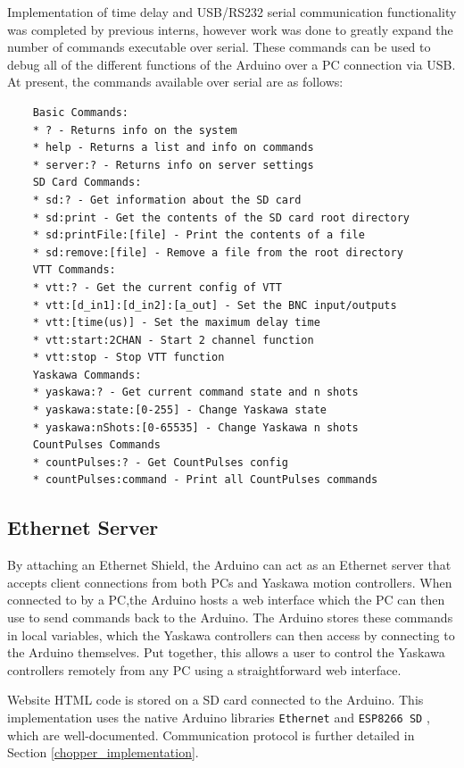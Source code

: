\documentclass{article}
\begin{document}
        Implementation of time delay and USB/RS232 serial communication functionality was completed by previous interns, however work was done to greatly expand the number of commands executable over serial. These commands can be used to debug all of the different functions of the Arduino over a PC connection via USB. At present, the commands available over serial are as follows:
        
        \begin{verbatim}
    Basic Commands:
    * ? - Returns info on the system
    * help - Returns a list and info on commands
    * server:? - Returns info on server settings
    SD Card Commands:
    * sd:? - Get information about the SD card
    * sd:print - Get the contents of the SD card root directory
    * sd:printFile:[file] - Print the contents of a file
    * sd:remove:[file] - Remove a file from the root directory
    VTT Commands:
    * vtt:? - Get the current config of VTT
    * vtt:[d_in1]:[d_in2]:[a_out] - Set the BNC input/outputs
    * vtt:[time(us)] - Set the maximum delay time
    * vtt:start:2CHAN - Start 2 channel function
    * vtt:stop - Stop VTT function
    Yaskawa Commands:
    * yaskawa:? - Get current command state and n shots
    * yaskawa:state:[0-255] - Change Yaskawa state
    * yaskawa:nShots:[0-65535] - Change Yaskawa n shots
    CountPulses Commands
    * countPulses:? - Get CountPulses config
    * countPulses:command - Print all CountPulses commands
        \end{verbatim}
        
        \subsection{Ethernet Server} \label{arduino_server}
        
        By attaching an Ethernet Shield, the Arduino can act as an Ethernet server that accepts client connections from both PCs and Yaskawa motion controllers. When connected to by a PC,the Arduino hosts a web interface which the PC can then use to send commands back to the Arduino. The Arduino stores these commands in local variables, which the Yaskawa controllers can then access by connecting to the Arduino themselves. Put together, this allows a user to control the Yaskawa controllers remotely from any PC using a straightforward web interface. 
        
        Website HTML code is stored on a SD card connected to the Arduino. This implementation uses the native Arduino libraries \texttt{Ethernet} \cite{ethernet_library} and \texttt{ESP8266 SD} \cite{sd_library}, which are well-documented. Communication protocol is further detailed in Section \ref{chopper_implementation}.
        
\end{document}
